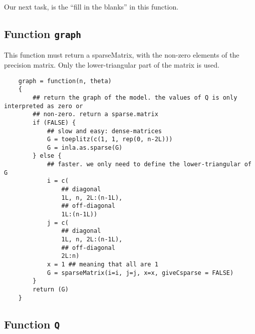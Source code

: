 \documentclass[a4paper,11pt]{article}
\begin{document}
Our next task, is the ``fill in the blanks'' in this function.


\subsection*{Function \texttt{graph}}

This function must return a sparseMatrix, with the non-zero elements
of the precision matrix. Only the lower-triangular part of the matrix
is used. 
{\small
\begin{verbatim}
    graph = function(n, theta)
    {
        ## return the graph of the model. the values of Q is only interpreted as zero or
        ## non-zero. return a sparse.matrix
        if (FALSE) {
            ## slow and easy: dense-matrices
            G = toeplitz(c(1, 1, rep(0, n-2L)))
            G = inla.as.sparse(G)
        } else {
            ## faster. we only need to define the lower-triangular of G
            i = c(
                ## diagonal
                1L, n, 2L:(n-1L),
                ## off-diagonal
                1L:(n-1L))
            j = c(
                ## diagonal
                1L, n, 2L:(n-1L),
                ## off-diagonal
                2L:n)
            x = 1 ## meaning that all are 1
            G = sparseMatrix(i=i, j=j, x=x, giveCsparse = FALSE)
        }            
        return (G)
    }
\end{verbatim}
}

\subsection*{Function \texttt{Q}}
\end{document}
